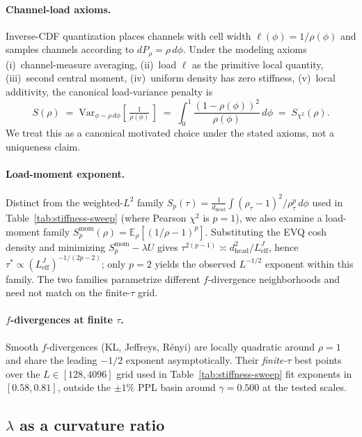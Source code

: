 \paragraph{Channel-load axioms.} Inverse-CDF quantization places channels with cell width $\ell(\phi){=}1/\rho(\phi)$ and samples channels according to $dP_\rho{=}\rho\,d\phi$. Under the modeling axioms (i)~channel-measure averaging, (ii)~load $\ell$ as the primitive local quantity, (iii)~second central moment, (iv)~uniform density has zero stiffness, (v)~local additivity, the canonical load-variance penalty is
\begin{equation}
S(\rho) \;=\; \mathrm{Var}_{\phi\sim\rho\,d\phi}\!\left[\,\tfrac{1}{\rho(\phi)}\,\right] \;=\; \int_0^1 \frac{(1-\rho(\phi))^2}{\rho(\phi)}\,d\phi \;=\; S_{\chi^2}(\rho).
\label{eq:chi2-load-identity}
\end{equation}
We treat this as a canonical motivated choice under the stated axioms, not a uniqueness claim.

\paragraph{Load-moment exponent.} Distinct from the weighted-$L^2$ family $S_p(\tau){=}\frac{1}{d_{\mathrm{head}}}\int(\rho_\tau{-}1)^2/\rho_\tau^p\,d\phi$ used in Table~\ref{tab:stiffness-sweep} (where Pearson $\chi^2$ is $p{=}1$), we also examine a load-moment family $S^{\mathrm{mom}}_p(\rho){=}\mathbb{E}_\rho[(1/\rho{-}1)^p]$. Substituting the EVQ cosh density and minimizing $S^{\mathrm{mom}}_p{-}\lambda U$ gives $\tau^{2(p-1)}\asymp d_{\mathrm{head}}^2/L_{\mathrm{eff}}^{J}$, hence $\tau^{*}\propto (L_{\mathrm{eff}}^{J})^{-1/(2p-2)}$; only $p{=}2$ yields the observed $L^{-1/2}$ exponent within this family. The two families parametrize different $f$-divergence neighborhoods and need not match on the finite-$\tau$ grid.

\paragraph{$f$-divergences at finite $\tau$.} Smooth $f$-divergences (KL, Jeffreys, R\'enyi) are locally quadratic around $\rho{=}1$ and share the leading $-1/2$ exponent asymptotically. Their \emph{finite-$\tau$} best points over the $L\!\in\![128,4096]$ grid used in Table~\ref{tab:stiffness-sweep} fit exponents in $[0.58,0.81]$, outside the $\pm 1\%$ PPL basin around $\gamma{=}0.500$ at the tested scales.

\subsection{\texorpdfstring{$\lambda$}{lambda} as a curvature ratio}
\label{sec:lambda-curvature}

